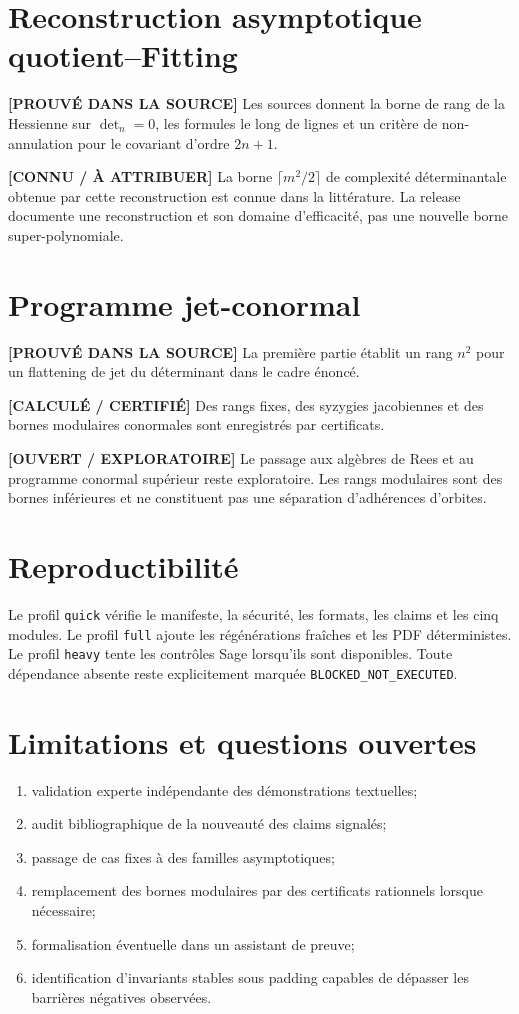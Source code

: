 \documentclass[10pt]{article}
\newcommand{\proved}{\textcolor{proved}{\textbf{[PROUVÉ DANS LA SOURCE]}}}
\newcommand{\computed}{\textcolor{computed}{\textbf{[CALCULÉ / CERTIFIÉ]}}}
\newcommand{\known}{\textcolor{known}{\textbf{[CONNU / À ATTRIBUER]}}}
\newcommand{\openstatus}{\textcolor{open}{\textbf{[OUVERT / EXPLORATOIRE]}}}
\begin{document}
\section{Reconstruction asymptotique quotient--Fitting}
\proved{} Les sources donnent la borne de rang de la Hessienne sur $\det_n=0$, les formules le long de lignes et un critère de non-annulation pour le covariant d'ordre $2n+1$.

\known{} La borne $\lceil m^2/2\rceil$ de complexité déterminantale obtenue par cette reconstruction est connue dans la littérature. La release documente une reconstruction et son domaine d'efficacité, pas une nouvelle borne super-polynomiale.

\section{Programme jet-conormal}
\proved{} La première partie établit un rang $n^2$ pour un flattening de jet du déterminant dans le cadre énoncé.

\computed{} Des rangs fixes, des syzygies jacobiennes et des bornes modulaires conormales sont enregistrés par certificats.

\openstatus{} Le passage aux algèbres de Rees et au programme conormal supérieur reste exploratoire. Les rangs modulaires sont des bornes inférieures et ne constituent pas une séparation d'adhérences d'orbites.

\section{Reproductibilité}
Le profil \texttt{quick} vérifie le manifeste, la sécurité, les formats, les claims et les cinq modules. Le profil \texttt{full} ajoute les régénérations fraîches et les PDF déterministes. Le profil \texttt{heavy} tente les contrôles Sage lorsqu'ils sont disponibles. Toute dépendance absente reste explicitement marquée \texttt{BLOCKED\_NOT\_EXECUTED}.

\section{Limitations et questions ouvertes}
\begin{enumerate}[leftmargin=*]
  \item validation experte indépendante des démonstrations textuelles;
  \item audit bibliographique de la nouveauté des claims signalés;
  \item passage de cas fixes à des familles asymptotiques;
  \item remplacement des bornes modulaires par des certificats rationnels lorsque nécessaire;
  \item formalisation éventuelle dans un assistant de preuve;
  \item identification d'invariants stables sous padding capables de dépasser les barrières négatives observées.
\end{enumerate}
\end{document}
